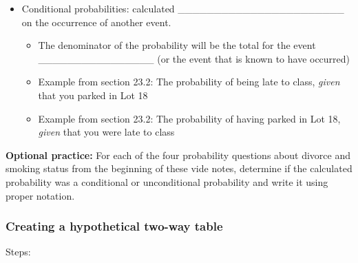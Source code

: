 \documentclass[
]{report}
\providecommand{\tightlist}{%
  \setlength{\itemsep}{0pt}\setlength{\parskip}{0pt}}
\begin{document}
\begin{itemize}
\begin{itemize}
\begin{itemize}
      \begin{itemize}
      \tightlist
      \item
        Example from section 23.2: The probability of being late to class
      \end{itemize}
    \item
      An ``And'' probability

      \begin{itemize}
      \tightlist
      \item
        Example from section 23.2: The probability of finding an open parking spot in Lot 6 \textbf{and} being late to class
      \end{itemize}
    \end{itemize}
  \end{itemize}
\item
  Conditional probabilities: calculated \_\_\_\_\_\_\_\_\_\_\_\_\_\_\_\_\_\_\_\_\_\_\_ on the occurrence of another event.

  \begin{itemize}
  \item
    The denominator of the probability will be the total for the event \_\_\_\_\_\_\_\_\_\_\_\_\_\_\_\_ (or the event that is known to have occurred)
  \item
    Example from section 23.2: The probability of being late to class, \emph{given} that you parked in Lot 18
  \item
    Example from section 23.2: The probability of having parked in Lot 18, \emph{given} that you were late to class
  \end{itemize}
\end{itemize}

\textbf{Optional practice:} For each of the four probability questions about divorce and smoking status from the beginning of these vide notes, determine if the calculated probability was a conditional or unconditional probability and write it using proper notation.


\subsubsection*{Creating a hypothetical two-way table}\label{creating-a-hypothetical-two-way-table}

Steps:
\end{document}
